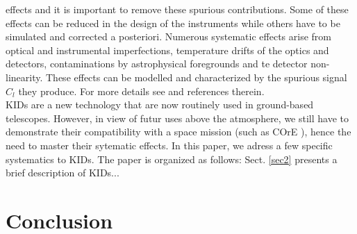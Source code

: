 \documentclass[twocolumn, traditabstract]{aa}
\begin{document}
effects and it is important to remove these spurious contributions. Some of
these effects can be reduced in the design of the instruments while others have
to be simulated and corrected a posteriori. Numerous systematic effects arise
from optical and instrumental imperfections, temperature drifts of the optics
and detectors, contaminations by astrophysical foregrounds and te detector
non-linearity. These effects can be modelled and characterized by the spurious
signal $C_{l}$ they produce. For more details see \citep{2008PhRvD..77h3003S,
  quickpol} and references therein.\\ KIDs are a new technology that are now
routinely used in ground-based telescopes. However, in view of futur
uses above the atmosphere, we still have to demonstrate their
compatibility with a space mission (such as COrE \citep{2016arXiv160907263D}),
hence the need to master their sytematic effects. In this paper, we adress a few
specific systematics to KIDs. The paper is organized as follows:
Sect. \ref{sec2} presents a brief description of KIDs...






\section{Conclusion}
\label{conclusion}
\end{document}
